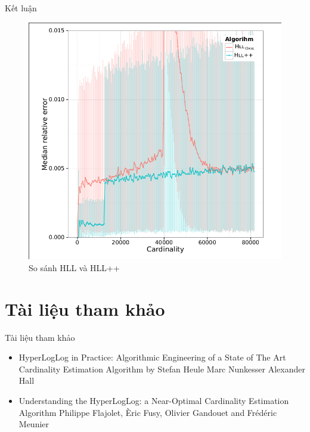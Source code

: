 \documentclass{beamer}
\newcommand{\bi}{\begin{itemize}}
\newcommand{\ei}{\end{itemize}}
\begin{document}
\begin{frame}{Kết luận }
\begin{figure}[H]
\includegraphics[scale=0.2]{KL.png}
\caption{ So sánh HLL và HLL++}
\end{figure}
\end{frame}
\section*{Tài liệu tham khảo}

\begin{frame}{Tài liệu tham khảo}
    \vspace{20pt}

    \bi
        \item HyperLogLog in Practice: Algorithmic Engineering of a
State of The Art Cardinality Estimation Algorithm by Stefan Heule Marc Nunkesser Alexander Hall
        \item Understanding the HyperLogLog: a
Near-Optimal Cardinality Estimation Algorithm
Philippe Flajolet, Èric Fusy, Olivier Gandouet and Frédéric Meunier
    \ei
\end{frame}
\end{document}
